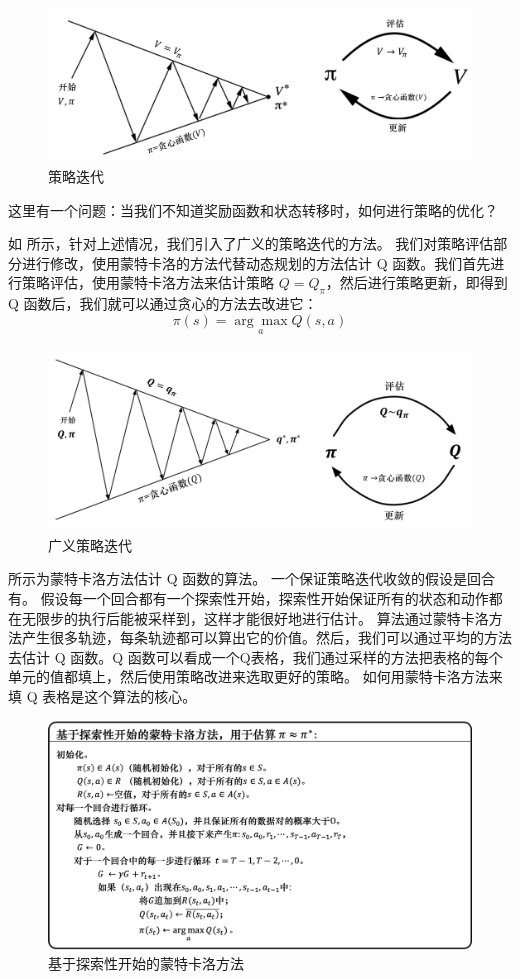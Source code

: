 \begin{figure}[htb]
	\centering
	\includegraphics[width=0.5\linewidth]{res/ch3/model_free_control_1}
	\caption{策略迭代}
	\label{fig:mode_free_control_1}
\end{figure}

这里有一个问题：当我们不知道奖励函数和状态转移时，如何进行策略的优化？

如 所示，针对上述情况，我们引入了广义的策略迭代的方法。
我们对策略评估部分进行修改，使用蒙特卡洛的方法代替动态规划的方法估计 Q 函数。我们首先进行策略评估，使用蒙特卡洛方法来估计策略 $Q=Q_{\pi}$，然后进行策略更新，即得到 Q 函数后，我们就可以通过贪心的方法去改进它：
\begin{equation}
	\label{eq:}
	\pi(s)=\underset{a}{\arg \max} Q(s, a)
\end{equation}

\begin{figure}[htb]
	\centering
	\includegraphics[width=0.5\linewidth]{res/ch3/model_free_control_3}
	\caption{广义策略迭代}
	\label{fig:GPI}
\end{figure}

 所示为蒙特卡洛方法估计 Q 函数的算法。
一个保证策略迭代收敛的假设是回合有。
假设每一个回合都有一个探索性开始，探索性开始保证所有的状态和动作都在无限步的执行后能被采样到，这样才能很好地进行估计。
算法通过蒙特卡洛方法产生很多轨迹，每条轨迹都可以算出它的价值。然后，我们可以通过平均的方法去估计 Q 函数。Q 函数可以看成一个Q表格，我们通过采样的方法把表格的每个单元的值都填上，然后使用策略改进来选取更好的策略。
如何用蒙特卡洛方法来填 Q 表格是这个算法的核心。

\begin{figure}[htb]
	\centering
	\includegraphics[width=0.5\linewidth]{res/ch3/model_free_control_4}
	\caption{基于探索性开始的蒙特卡洛方法}
	\label{fig:MC_ES}
\end{figure}

